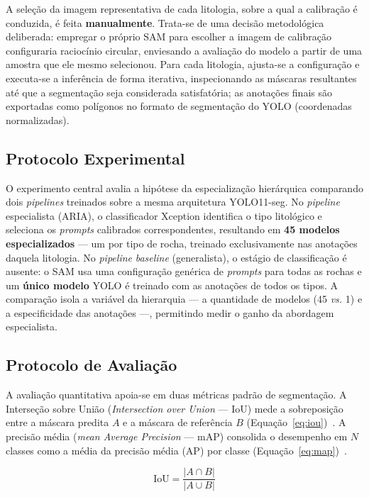 \documentclass[12pt]{article}
\begin{document}
A seleção da imagem representativa de cada litologia, sobre a qual a calibração é conduzida, é feita \textbf{manualmente}. Trata-se de uma decisão metodológica deliberada: empregar o próprio SAM para escolher a imagem de calibração configuraria raciocínio circular, enviesando a avaliação do modelo a partir de uma amostra que ele mesmo selecionou. Para cada litologia, ajusta-se a configuração e executa-se a inferência de forma iterativa, inspecionando as máscaras resultantes até que a segmentação seja considerada satisfatória; as anotações finais são exportadas como polígonos no formato de segmentação do YOLO (coordenadas normalizadas).

\subsection{Protocolo Experimental}

O experimento central avalia a hipótese da especialização hierárquica comparando dois \textit{pipelines} treinados sobre a mesma arquitetura YOLO11-seg. No \textit{pipeline} especialista (ARIA), o classificador Xception identifica o tipo litológico e seleciona os \textit{prompts} calibrados correspondentes, resultando em \textbf{45 modelos especializados} --- um por tipo de rocha, treinado exclusivamente nas anotações daquela litologia. No \textit{pipeline} \textit{baseline} (generalista), o estágio de classificação é ausente: o SAM usa uma configuração genérica de \textit{prompts} para todas as rochas e um \textbf{único modelo} YOLO é treinado com as anotações de todos os tipos. A comparação isola a variável da hierarquia --- a quantidade de modelos (45 \textit{vs.} 1) e a especificidade das anotações ---, permitindo medir o ganho da abordagem especialista.

\subsection{Protocolo de Avaliação}

A avaliação quantitativa apoia-se em duas métricas padrão de segmentação. A Interseção sobre União (\textit{Intersection over Union} --- IoU) mede a sobreposição entre a máscara predita $A$ e a máscara de referência $B$ (Equação~\ref{eq:iou})~\cite{iou_mahmood2021}. A precisão média (\textit{mean Average Precision} --- mAP) consolida o desempenho em $N$ classes como a média da precisão média ($\mathrm{AP}$) por classe (Equação~\ref{eq:map})~\cite{voc_everingham2010}.

\begin{equation}
  \mathrm{IoU} = \frac{|A \cap B|}{|A \cup B|}
  \label{eq:iou}
\end{equation}
\end{document}
